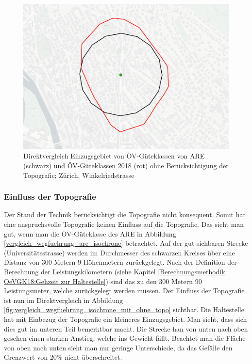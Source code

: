 \begin{figure}[ht]
    \centering
    \includegraphics[width=0.8\linewidth]{technicalreport/img/vergleich_wegfuehrung_are_isochrone}
    \caption[Direktvergleich Einzugsgebiet ARE und Isochrone]{Direktvergleich Einzugsgebiet von ÖV-Güteklassen von \ac{ARE} (schwarz) und ÖV-Güteklassen 2018 (rot) ohne Berücksichtigung der Topografie; Zürich, Winkelriedstrasse}
    \label{fig:vergleich_wegfuehrung_are_isochrone}
\end{figure}

\subsubsection{Einfluss der Topografie}

Der Stand der Technik berücksichtigt die Topografie nicht konsequent.
Somit hat eine anspruchsvolle Topografie keinen Einfluss auf die Topografie.
Das sieht man gut, wenn man die ÖV-Güteklasse des \acl{ARE} in Abbildung \ref{vergleich_wegfuehrung_are_isochrone} betrachtet.
Auf der gut sichbaren Strecke (Universitätsstrasse) werden im Durchmesser des schwarzen Kreises über eine Distanz von 300 Metern 9 Höhenmetern zurückgelegt.
Nach der Definition der Berechnung der Leistungskilometern (siehe Kapitel \ref{Berechnungsmethodik OeVGK18:Gehzeit zur Haltestelle}) sind das zu den 300 Metern 90 Leistungsmeter, welche zurückgelegt werden müssen.
Der Einfluss der Topografie ist nun im Direktvergleich in Abbildung \ref{fig:vergleich_wegfuehrung_isochrone_mit_ohne_topo} sichtbar.
Die Haltestelle hat mit Einbezug der Topografie ein kleineres Einzugsgebiet.
Man sieht, dass sich dies gut im unteren Teil bemerktbar macht.
Die Strecke han von unten nach oben gesehen einen starken Anstieg, welche ins Gewicht fällt.
Beachtet man die Fläche von oben nach unten sieht man nur geringe Unterschiede, da das Gefälle den Grenzwert von 20\% nicht überschreitet.

